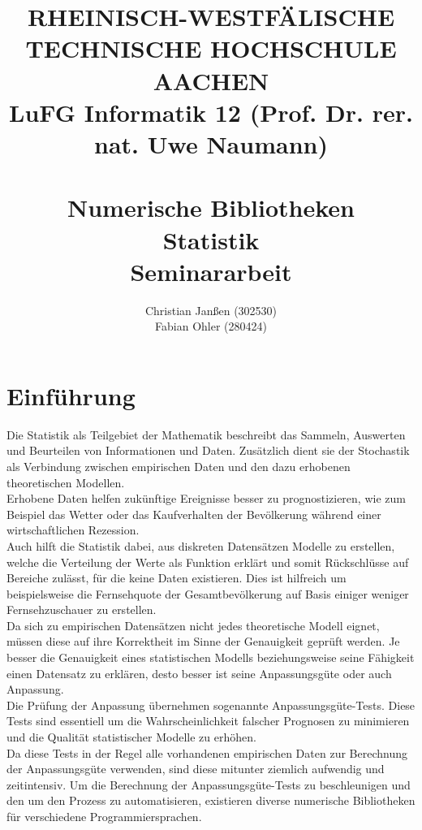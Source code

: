 \documentclass{article}
\title{
{\bf \scriptsize RHEINISCH-WESTF\"ALISCHE TECHNISCHE HOCHSCHULE AACHEN \\
LuFG Informatik 12 (Prof. Dr. rer. nat. Uwe Naumann)}
\vspace{.5cm} \\
\epsfig{file=figures/STCE_Logo_WWW.eps,width=.7\textwidth}
\vspace{1cm} \\
{\bf \Large Numerische Bibliotheken} \\
{\bf \large Statistik} \\
{\large Seminararbeit} 
}
\author{Christian Janßen (302530) \\ Fabian Ohler (280424) }
\begin{document}

\begin{titlepage}
\clearpage
\maketitle

\thispagestyle{empty}

\end{titlepage}

\pagestyle{headings}
\newpage
\section{Einführung}
Die Statistik als Teilgebiet der Mathematik beschreibt das Sammeln, Auswerten und Beurteilen von Informationen und Daten.
Zusätzlich dient sie der Stochastik als Verbindung zwischen empirischen Daten und den dazu erhobenen theoretischen Modellen.\\
Erhobene Daten helfen zukünftige Ereignisse besser zu prognostizieren, wie zum Beispiel das Wetter oder das Kaufverhalten der Bevölkerung während einer wirtschaftlichen Rezession.\\
Auch hilft die Statistik dabei, aus diskreten Datensätzen Modelle zu erstellen, welche die Verteilung der Werte als Funktion erklärt und somit Rückschlüsse auf Bereiche zulässt, für die keine Daten existieren. Dies ist hilfreich um beispielsweise die Fernsehquote der Gesamtbevölkerung auf Basis einiger weniger Fernsehzuschauer zu erstellen.\\
Da sich zu empirischen Datensätzen nicht jedes theoretische Modell eignet, müssen diese auf ihre Korrektheit im Sinne der Genauigkeit geprüft werden. Je besser die Genauigkeit eines statistischen Modells beziehungsweise seine Fähigkeit einen Datensatz zu erklären, desto besser ist seine Anpassungsgüte oder auch Anpassung.\\
Die Prüfung der Anpassung übernehmen sogenannte Anpassungsgüte-Tests. Diese Tests sind essentiell um die Wahrscheinlichkeit falscher Prognosen zu minimieren und die Qualität statistischer Modelle zu erhöhen.\\
Da diese Tests in der Regel alle vorhandenen empirischen Daten zur Berechnung der Anpassungsgüte verwenden, sind diese mitunter ziemlich aufwendig und zeitintensiv. Um die Berechnung der Anpassungsgüte-Tests zu beschleunigen und den um den Prozess zu automatisieren, existieren diverse numerische Bibliotheken für verschiedene Programmiersprachen.\\
\end{document}
